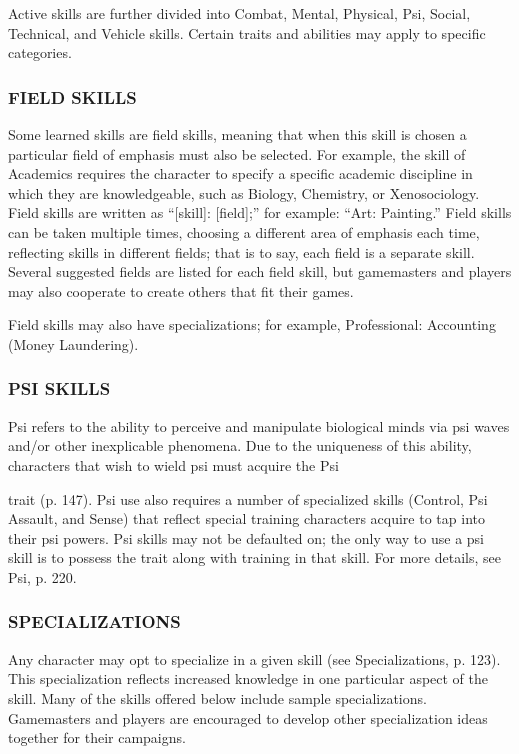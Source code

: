 Active skills are further divided into Combat, Mental, Physical, Psi, Social, Technical, and Vehicle skills. Certain traits and abilities may apply to specific categories. 



\subsubsection{FIELD SKILLS} Some learned skills are field skills, meaning that when this skill is chosen a particular field of emphasis must also be selected. For example, the skill of Academics requires the character to specify a specific academic discipline in which they are knowledgeable, such as Biology, Chemistry, or Xenosociology. Field skills are written as “[skill]: [field];” for example: “Art: Painting.” Field skills can be taken multiple times, choosing a different area of emphasis each time, reflecting skills in different fields; that is to say, each field is a separate skill. Several suggested fields are listed for each field skill, but gamemasters and players may also cooperate to create others that fit their games. 

Field skills may also have specializations; for example, Professional: Accounting (Money Laundering). 



\subsubsection{PSI SKILLS} Psi refers to the ability to perceive and manipulate biological minds via psi waves and/or other inexplicable phenomena. Due to the uniqueness of this ability, characters that wish to wield psi must acquire the Psi 



trait (p. 147). Psi use also requires a number of specialized skills (Control, Psi Assault, and Sense) that reflect special training characters acquire to tap into their psi powers. Psi skills may not be defaulted on; the only way to use a psi skill is to possess the trait along with training in that skill. For more details, see Psi, p. 220. 



\subsubsection{SPECIALIZATIONS} Any character may opt to specialize in a given skill (see Specializations, p. 123). This specialization reflects increased knowledge in one particular aspect of the skill. Many of the skills offered below include sample specializations. Gamemasters and players are encouraged to develop other specialization ideas together for their campaigns. 

